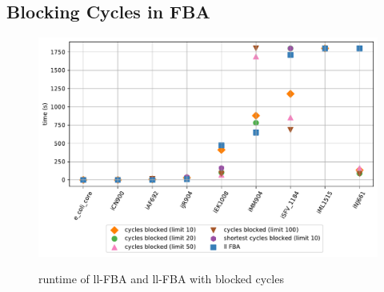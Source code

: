 \subsection{Blocking Cycles in FBA}
\begin{figure}[h!]
    \caption{runtime of ll-FBA and ll-FBA with blocked cycles}
    \centering
    \includegraphics[width=1.0\textwidth]{Images/cff_comparison.pdf}
    \label{fig:cff_comparison}
\end{figure}


